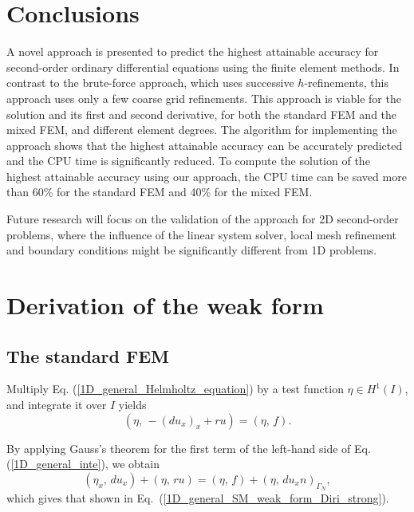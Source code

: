 \documentclass[review,3p]{elsarticle}
\begin{document}
\section{Conclusions}		\label{paragraph on conclusion}

A novel approach is presented to predict the highest attainable accuracy for second-order ordinary differential equations using the finite element methods.
In contrast to the brute-force approach, which uses successive $h$-refinements, this approach uses only a few coarse grid refinements. 
This approach is viable for the solution and its first and second derivative, for both the standard FEM and the mixed FEM, and different element degrees.
The algorithm for implementing the approach shows that the highest attainable accuracy can be accurately predicted and the CPU time is significantly reduced.
To compute the solution of the highest attainable accuracy using our approach, the CPU time can be saved more than 60\% for the standard FEM and 40\% for the mixed FEM.

Future research will focus on the validation of the approach for 2D second-order problems, where the influence of the linear system solver, local mesh refinement and boundary conditions might be significantly different from 1D problems. 

\appendix

\section{Derivation of the weak form}		\label{weak form appendix}

\subsection{The standard FEM}		\label{derivation_weak_form_SM}

Multiply Eq. (\ref{1D_general_Helmholtz_equation}) by a test function $\eta \in H ^1 (I)$, and integrate it over $I$ yields
\begin{equation}
(\eta, \, -\left(d u_x \right)_x + ru) = (\eta, \, f). \label{1D_general_inte}
\end{equation}

By applying Gauss's theorem for the first term of the left-hand side of Eq. (\ref{1D_general_inte}), we obtain
\begin{equation}
 ({\eta} _x, \, d u_x) + (\eta, \, ru) = (\eta, \, f) + \left( \eta, \, d u_x n \right)_{ {\Gamma_N}},		\label{1D_general_gauss}
\end{equation}
which gives that shown in Eq.~({\ref{1D_general_SM_weak_form_Diri_strong}}).
\end{document}
